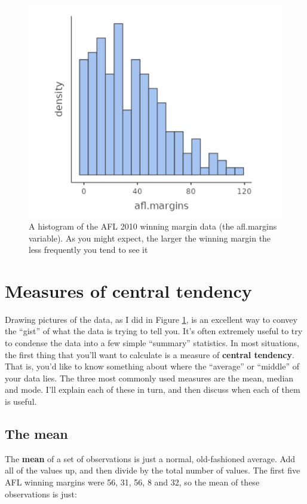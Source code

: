 \documentclass[
]{book}
\begin{document}
\begin{figure}
\includegraphics[width=0.9\linewidth]{images/Figure9} \caption{A histogram of the AFL 2010 winning margin data (the afl.margins variable). As you might expect, the larger the winning margin the less frequently you tend to see it}\label{fig:fig4-2}
\end{figure}

\hypertarget{measures-of-central-tendency}{%
\section{Measures of central tendency}\label{measures-of-central-tendency}}

Drawing pictures of the data, as I did in Figure \ref{fig:fig4-2}, is an excellent way to convey the ``gist'' of what the data is trying to tell you. It's often extremely useful to try to condense the data into a few simple ``summary'' statistics. In most situations, the first thing that you'll want to calculate is a measure of \textbf{central tendency}. That is, you'd like to know something about where the ``average'' or ``middle'' of your data lies. The three most commonly used measures are the mean, median and mode. I'll explain each of these in turn, and then discuss when each of them is useful.

\hypertarget{the-mean}{%
\subsection{The mean}\label{the-mean}}

The \textbf{mean} of a set of observations is just a normal, old-fashioned average. Add all of the values up, and then divide by the total number of values. The first five AFL winning margins were 56, 31, 56, 8 and 32, so the mean of these observations is just:
\end{document}
